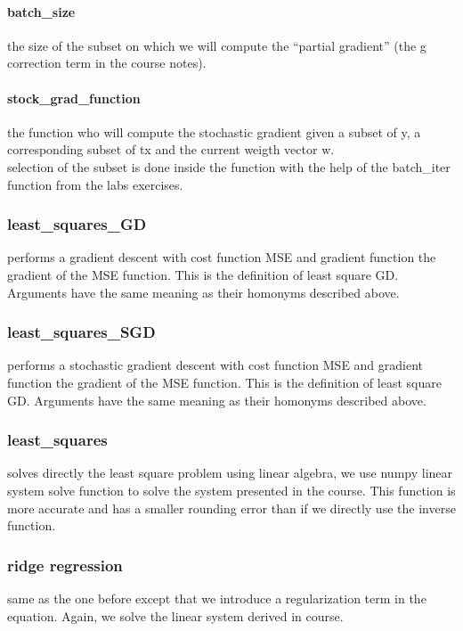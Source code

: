 \documentclass[10pt,conference,compsocconf]{IEEEtran}
\begin{document}
\paragraph{batch\_size} the size of the subset on which we will compute the
``partial gradient'' (the g correction term in the course notes).
\paragraph{stock\_grad\_function} the function who will compute the stochastic
gradient given a subset of y, a corresponding subset of tx and the
current weigth vector w.
\\selection of the subset is done inside the function with
the help of the batch\_iter function from the labs exercises.


\subsubsection{least\_squares\_GD}
performs a gradient descent with cost function MSE and gradient function the gradient of the MSE function. This is the definition of least square GD. Arguments have the same meaning as their homonyms described above.

\subsubsection{least\_squares\_SGD}
performs a stochastic gradient descent with cost function MSE and gradient function the gradient of the MSE function. This is the definition of least square GD. Arguments have the same meaning as their homonyms described above.

\subsubsection{least\_squares}
solves directly the least square problem using linear algebra, we use numpy linear system solve function to solve the system presented in the course. This function is more accurate and has a smaller rounding error than if we directly use the inverse function.

\subsubsection{ridge regression}

same as the one before except that we introduce a regularization term in the equation. Again, we solve the linear system derived in course.
\end{document}
